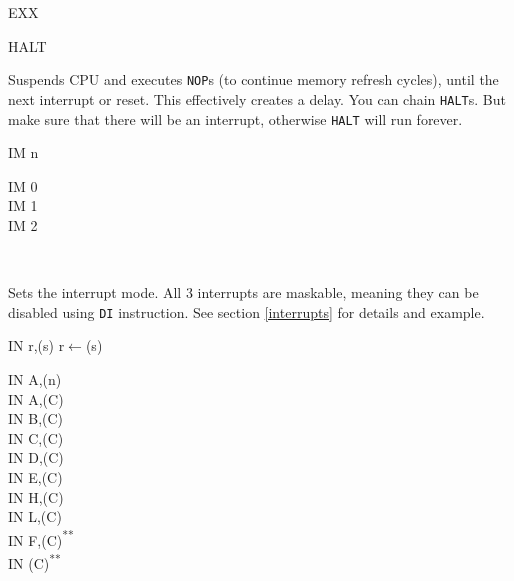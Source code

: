 \documentclass[12pt,twoside,openright,a4paper]{book}
\newcommand{\UNDOC}{\textnormal{\textsuperscript{**}}}
\begin{document}
\begin{basedescript}{
	\desclabelstyle{\multilinelabel}
	\desclabelwidth{3cm}}
\begin{detailitem}{EXX}
	\end{detailitem}

	\begin{detailitem}{HALT}
		{}

		Suspends CPU and executes {\tt NOP}s (to continue memory refresh cycles), until the next interrupt or reset. This effectively creates a delay. You can chain {\tt HALT}s. But make sure that there will be an interrupt, otherwise {\tt HALT} will run forever.

		\DetailNoEffect
						
		\begin{DetailTiming}
		\end{DetailTiming}

	\end{detailitem}

	\begin{detailitem}{IM n}
		{}

		\begin{DetailVariants}[1]
			IM 0\\
			IM 1\\
			IM 2
			
			\columnbreak
			~
		\end{DetailVariants}

		Sets the interrupt mode. All 3 interrupts are maskable, meaning they can be disabled using {\tt DI} instruction. See section \ref{interrupts} for details and example.

		\DetailNoEffect		

		\begin{DetailTiming}
			\DetailTime{}{2}{8}
		\end{DetailTiming}

	\end{detailitem}

	\pagebreak
	\begin{detailitem}{IN r,(s)}
		{r$\leftarrow$(s)}

		\begin{DetailVariants}
			IN A,(n)\\
			IN A,(C)\\
			IN B,(C)\\
			IN C,(C)\\
			IN D,(C)\\
			IN E,(C)\\
			IN H,(C)\\
			IN L,(C)\\
			IN F,(C)\UNDOC\\
			IN (C)\UNDOC
		\end{DetailVariants}


\end{detailitem}
\end{basedescript}
\end{document}
